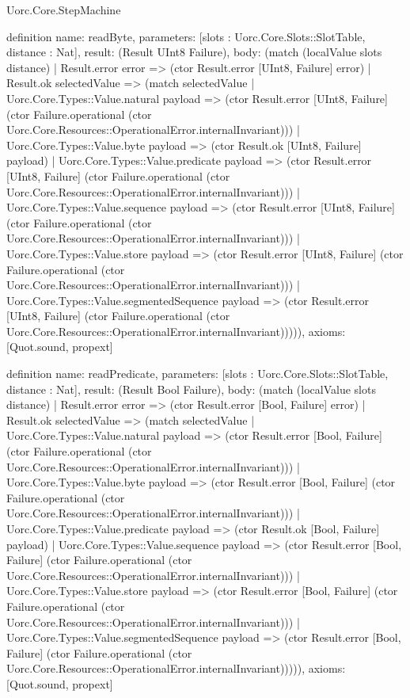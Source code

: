 \begin{lexlean}{Uorc.Core.StepMachine}
\begin{semanticmodule}
definition{
  name: readByte,
  parameters: [slots : Uorc.Core.Slots::SlotTable, distance : Nat],
  result: (Result UInt8 Failure),
  body: (match (localValue slots distance)
    | Result.error error => (ctor Result.error [UInt8, Failure] error)
    | Result.ok selectedValue => (match selectedValue
      | Uorc.Core.Types::Value.natural payload => (ctor Result.error [UInt8, Failure] (ctor Failure.operational (ctor Uorc.Core.Resources::OperationalError.internalInvariant)))
      | Uorc.Core.Types::Value.byte payload => (ctor Result.ok [UInt8, Failure] payload)
      | Uorc.Core.Types::Value.predicate payload => (ctor Result.error [UInt8, Failure] (ctor Failure.operational (ctor Uorc.Core.Resources::OperationalError.internalInvariant)))
      | Uorc.Core.Types::Value.sequence payload => (ctor Result.error [UInt8, Failure] (ctor Failure.operational (ctor Uorc.Core.Resources::OperationalError.internalInvariant)))
      | Uorc.Core.Types::Value.store payload => (ctor Result.error [UInt8, Failure] (ctor Failure.operational (ctor Uorc.Core.Resources::OperationalError.internalInvariant)))
      | Uorc.Core.Types::Value.segmentedSequence payload => (ctor Result.error [UInt8, Failure] (ctor Failure.operational (ctor Uorc.Core.Resources::OperationalError.internalInvariant))))),
  axioms: [Quot.sound, propext]
}

definition{
  name: readPredicate,
  parameters: [slots : Uorc.Core.Slots::SlotTable, distance : Nat],
  result: (Result Bool Failure),
  body: (match (localValue slots distance)
    | Result.error error => (ctor Result.error [Bool, Failure] error)
    | Result.ok selectedValue => (match selectedValue
      | Uorc.Core.Types::Value.natural payload => (ctor Result.error [Bool, Failure] (ctor Failure.operational (ctor Uorc.Core.Resources::OperationalError.internalInvariant)))
      | Uorc.Core.Types::Value.byte payload => (ctor Result.error [Bool, Failure] (ctor Failure.operational (ctor Uorc.Core.Resources::OperationalError.internalInvariant)))
      | Uorc.Core.Types::Value.predicate payload => (ctor Result.ok [Bool, Failure] payload)
      | Uorc.Core.Types::Value.sequence payload => (ctor Result.error [Bool, Failure] (ctor Failure.operational (ctor Uorc.Core.Resources::OperationalError.internalInvariant)))
      | Uorc.Core.Types::Value.store payload => (ctor Result.error [Bool, Failure] (ctor Failure.operational (ctor Uorc.Core.Resources::OperationalError.internalInvariant)))
      | Uorc.Core.Types::Value.segmentedSequence payload => (ctor Result.error [Bool, Failure] (ctor Failure.operational (ctor Uorc.Core.Resources::OperationalError.internalInvariant))))),
  axioms: [Quot.sound, propext]
}


\end{semanticmodule}
\end{lexlean}
